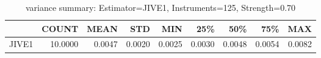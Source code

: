 \begin{table}[ht]
\centering
\caption{variance summary: Estimator=JIVE1, Instruments=125, Strength=0.70}
\begin{tabular}{lrrrrrrrr}
\toprule
 & COUNT & MEAN & STD & MIN & 25\% & 50\% & 75\% & MAX \\
\midrule
JIVE1 & 10.0000 & 0.0047 & 0.0020 & 0.0025 & 0.0030 & 0.0048 & 0.0054 & 0.0082 \\
\bottomrule
\end{tabular}
\end{table}
